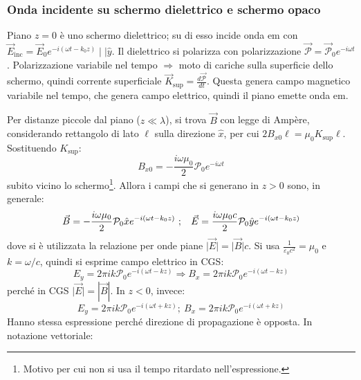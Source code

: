 \documentclass[10pt, a4paper]{scrartcl}
\numberwithin{equation}{subsection}
\theoremstyle{style1}
\begin{document}
\subsubsection{Onda incidente su schermo dielettrico e schermo opaco}

Piano $z=0$ \`e uno schermo dielettrico; su di esso incide onda em con $\vec{E}_\text{inc} = \vec{E}_0 e^{-i(\omega t - k_0 z)}  \mid  \mid \hat{y}$. Il dielettrico si polarizza con polarizzazione $\vec{\mathcal{P}} = \vec{\mathcal{P}}_0 e^{-i\omega t} $. Polarizzazione variabile nel tempo $\Rightarrow $ moto di cariche sulla superficie dello schermo, quindi corrente superficiale $\vec{K}_\text{sup} = \frac{d \vec{\mathcal{P}}}{d t} $. Questa genera campo magnetico variabile nel tempo, che genera campo elettrico, quindi il piano emette onda em.

Per distanze piccole dal piano ($z \ll \lambda $), si trova $\vec{B}$ con legge di Amp\`ere, considerando rettangolo di lato $\ell $ sulla direzione $\hat{x}$, per cui $2 B_{x0}  \ell  = \mu_0 K_\text{sup} \ell $. Sostituendo $K_\text{sup}$:
\begin{equation}
	B_{x 0} =-\frac{i \omega \mu_0}{2} \mathcal{P}_0 e^{-i\omega t} 
\end{equation}
subito vicino lo schermo\footnote{Motivo per cui non si usa il tempo ritardato nell'espressione.}. Allora i campi che si generano in $z>0$ sono, in generale:
\begin{equation}
	\vec{B} = - \frac{i\omega \mu_0}{2} \mathcal{P}_0\hat{x} e^{-i(\omega t - k_0 z )}\ ; \hspace{.3cm} \vec{E} = \frac{i\omega \mu_0 c}{2} \mathcal{P}_0 \hat{y} e^{-i(\omega t - k_0z)} 
\end{equation}
dove si \`e utilizzata la relazione per onde piane $\lvert \vec{E} \rvert = \lvert \vec{B} \rvert c$. Si usa $\frac{1}{\varepsilon _0 c^2} = \mu_0$ e $k = \omega / c$, quindi si esprime campo elettrico in CGS:
\begin{equation}
	E_y = 2\pi i k \mathcal{P}_0 e^{-i(\omega t - kz)} \Rightarrow B_x = 2\pi i k \mathcal{P}_0 e^{-i(\omega t - kz)} 
\end{equation}
perch\'e in CGS $\lvert \vec{E} \rvert = |\vec{B}|$. In $z< 0 $, invece:
\begin{equation}
	E_y = 2\pi i k \mathcal{P}_0 e^{-i (\omega t + k z)} ; \ B_x = 2\pi i k \mathcal{P}_0 e^{-i (\omega t + k z)} 
\end{equation}
Hanno stessa espressione perch\'e direzione di propagazione \`e opposta. In notazione vettoriale:
\end{document}

